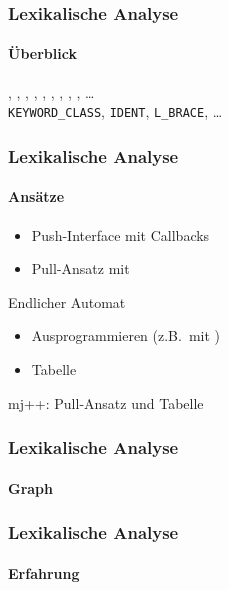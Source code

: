 \begin{frame}
    \frametitle{Lexikalische Analyse}
    \framesubtitle{Überblick}
    
    , , \token{\{}, , , , \token{(}, \token{)}, \token{\{}, \ldots \\
            \texttt{KEYWORD\_CLASS}, \texttt{IDENT}, \texttt{L\_BRACE}, \ldots
\end{frame}

\begin{frame}
    \frametitle{Lexikalische Analyse}
    \framesubtitle{Ansätze}
    \begin{itemize}
        \item Push-Interface mit Callbacks
        \item Pull-Ansatz mit 
    \end{itemize}
    Endlicher Automat
    \begin{itemize}
        \item Ausprogrammieren (z.B.\ mit )
        \item Tabelle
    \end{itemize}
    \vskip 1cm
    \begin{center}
        mj++: Pull-Ansatz und Tabelle
    \end{center}
\end{frame}

\begin{frame}
    \frametitle{Lexikalische Analyse}
    \framesubtitle{Graph}
\end{frame}


\begin{frame}
    \frametitle{Lexikalische Analyse}
    \framesubtitle{Erfahrung}
\end{frame}
